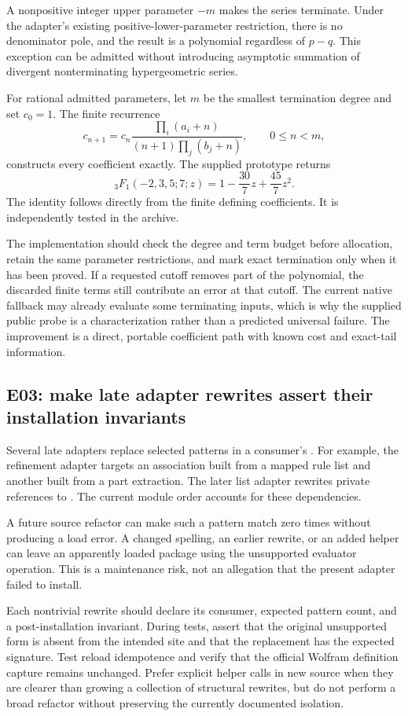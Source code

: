\documentclass[11pt,letterpaper]{article}
\newcommand{\code}[1]{\texttt{\detokenize{#1}}}
\begin{document}
A nonpositive integer upper parameter $-m$ makes the series terminate. Under the adapter's existing positive-lower-parameter restriction, there is no denominator pole, and the result is a polynomial regardless of $p-q$. This exception can be admitted without introducing asymptotic summation of divergent nonterminating hypergeometric series.

For rational admitted parameters, let $m$ be the smallest termination degree and set $c_0=1$. The finite recurrence
\[
 c_{n+1}=c_n\frac{\prod_i(a_i+n)}{(n+1)\prod_j(b_j+n)},
 \qquad 0\le n<m,
\]
constructs every coefficient exactly. The supplied prototype returns
\[
 {}_3F_1(-2,3,5;7;z)=1-\frac{30}{7}z+\frac{45}{7}z^2.
\]
The identity follows directly from the finite defining coefficients. It is independently tested in the archive.

The implementation should check the degree and term budget before allocation, retain the same parameter restrictions, and mark exact termination only when it has been proved. If a requested cutoff removes part of the polynomial, the discarded finite terms still contribute an error at that cutoff. The current native fallback may already evaluate some terminating inputs, which is why the supplied public \code{terminating-pfq} probe is a characterization rather than a predicted universal failure. The improvement is a direct, portable coefficient path with known cost and exact-tail information.

\subsection{E03: make late adapter rewrites assert their installation invariants}

Several late adapters replace selected patterns in a consumer's \code{DownValues}. For example, the refinement adapter targets an association built from a mapped rule list and another built from a part extraction. The later list adapter rewrites private references to \code{System`Map}. The current module order accounts for these dependencies.\cite{mathics-refinement,mathics-lists,core}

A future source refactor can make such a pattern match zero times without producing a load error. A changed spelling, an earlier rewrite, or an added helper can leave an apparently loaded package using the unsupported evaluator operation. This is a maintenance risk, not an allegation that the present adapter failed to install.

Each nontrivial rewrite should declare its consumer, expected pattern count, and a post-installation invariant. During tests, assert that the original unsupported form is absent from the intended site and that the replacement has the expected signature. Test reload idempotence and verify that the official Wolfram definition capture remains unchanged. Prefer explicit helper calls in new source when they are clearer than growing a collection of structural rewrites, but do not perform a broad refactor without preserving the currently documented isolation.
\end{document}
